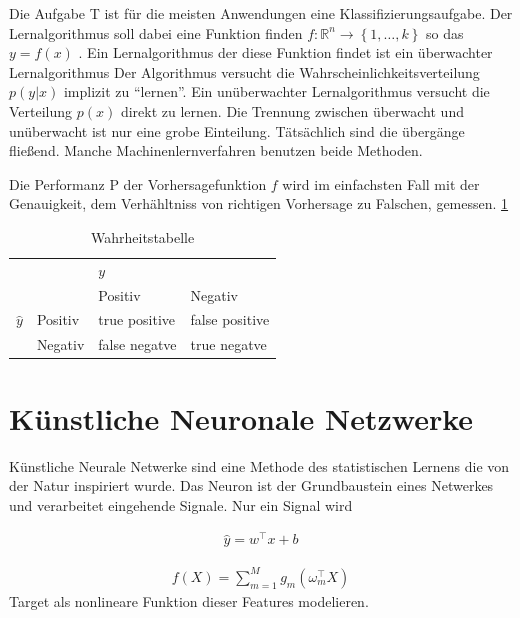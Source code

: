 Die Aufgabe T ist für die meisten Anwendungen eine Klassifizierungsaufgabe. 
Der Lernalgorithmus soll dabei eine Funktion finden \(f: \mathds{R}^n \rightarrow \left\{1,\dots,k \right\} \) so das \(y = f\left(x\right)\) \parencite[97 ff]{GoodfellowDeeplearning2016}.
Ein Lernalgorithmus der diese Funktion findet ist ein überwachter Lernalgorithmus 
Der Algorithmus versucht die Wahrscheinlichkeitsverteilung \(p(y | x)\) implizit zu ``lernen''. Ein unüberwachter Lernalgorithmus versucht die Verteilung \(p(x)\) direkt zu lernen.
Die Trennung zwischen überwacht und unüberwacht ist nur eine grobe Einteilung. Tätsächlich sind die übergänge fließend. 
Manche Machinenlernverfahren benutzen beide Methoden.  

Die Performanz P der Vorhersagefunktion \(f\) wird im einfachsten Fall mit der Genauigkeit,
dem Verhähltniss von richtigen Vorhersage zu Falschen, gemessen. 
\cref{tab:truth}
\begin{table}
    \caption{Wahrheitstabelle}
    \label{tab:truth}
    \begin{tabular}{llll}
                    &&\(y\)& \\
                            && Positiv       & Negativ \\
    \(\hat{y}\) & Positiv  & true positive  & false positive \\
                & Negativ & false negatve   & true negatve \\
    \end{tabular}       
\end{table}    
\section{Künstliche Neuronale Netzwerke}

Künstliche Neurale Netwerke sind eine Methode des statistischen Lernens die von der Natur inspiriert wurde. 
Das Neuron ist der Grundbaustein eines Netwerkes und verarbeitet eingehende Signale. 
Nur ein Signal wird

\begin{align}
    \hat { y } = w^{ \top } x + b
\end{align}

\begin{align}
    f(X)=\sum\limits_{m=1}^{M}g_{m}\left(\omega_{m}^{\top}X\right)
   \end{align}
Target als nonlineare Funktion dieser Features modelieren.  



